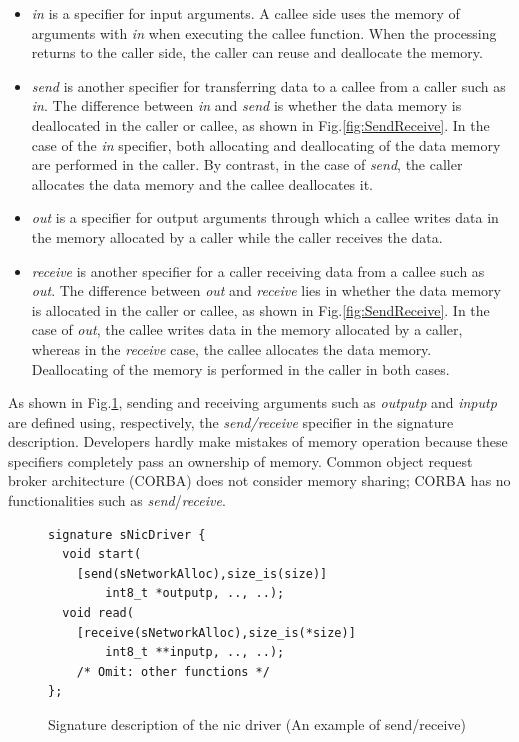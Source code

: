 \documentclass[JIP]{ipsj_v2/UTF8/ipsj}
\begin{document}
\begin{itemize}
\item {\it in} is a specifier for input arguments.
A callee side uses the memory of arguments with {\it in} when executing the callee function.
When the processing returns to the caller side, the caller can reuse and deallocate the memory.

\item {\it send} is another specifier for transferring data to a callee from a caller such as {\it in}.
The difference between {\it in} and {\it send} is whether the data memory is deallocated in the caller or callee, as shown in Fig.\ref{fig:SendReceive}.
In the case of the {\it in} specifier, both allocating and deallocating of the data memory are performed in the caller.
By contrast, in the case of {\it send}, the caller allocates the data memory and the callee deallocates it.

\item {\it out} is a specifier for output arguments through which a callee writes data in the memory allocated by a caller while the caller receives the data.

\item {\it receive} is another specifier for a caller receiving data from a callee such as {\it out}.
The difference between {\it out} and {\it receive} lies in whether the data memory is allocated in the caller or callee, as shown in Fig.\ref{fig:SendReceive}.
In the case of {\it out}, the callee writes data in the memory allocated by a caller, whereas in the {\it receive} case, the callee allocates the data memory.
Deallocating of the memory is performed in the caller in both cases.
\end{itemize}

As shown in Fig.\ref{src:SendReceive}, sending and receiving arguments such as {\it outputp} and {\it inputp} are defined using, respectively, the {\it send/receive} specifier in the signature description.
Developers hardly make mistakes of memory operation because these specifiers completely pass an ownership of memory.
Common object request broker architecture (CORBA) does not consider memory sharing; CORBA has no functionalities
such as {\it send}/{\it receive}.

\begin{figure}[t]
\centering
\begin{lstlisting}
signature sNicDriver {
  void start(
    [send(sNetworkAlloc),size_is(size)]
        int8_t *outputp, .., ..);
  void read(
    [receive(sNetworkAlloc),size_is(*size)]
        int8_t **inputp, .., ..);
    /* Omit: other functions */
};
\end{lstlisting}
\caption{Signature description of the nic driver (An example of send/receive)}
\label{src:SendReceive}
\end{figure}
\end{document}
